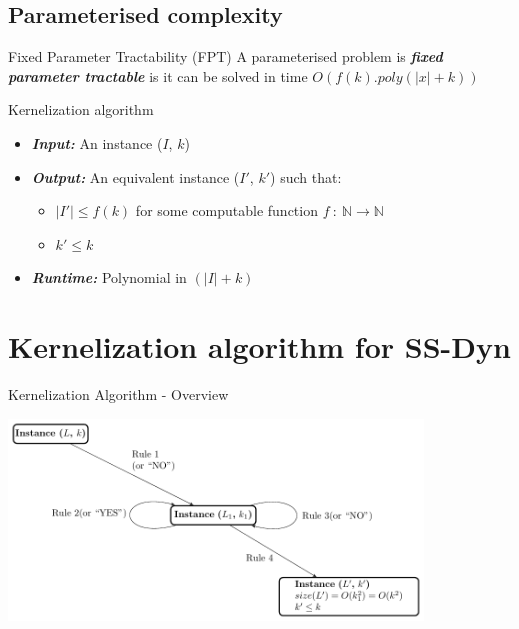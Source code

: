 \documentclass{beamer}
\newcommand{\N}{\mathbb{N}}
\begin{document}
\subsection{Parameterised complexity}
\begin{frame}
  \begin{block}{Fixed Parameter Tractability (FPT)}
    A parameterised problem is \emph{\bfseries fixed parameter tractable} is it can be solved in time $O(f(k).poly(|x|+k))$
  \end{block}
  \begin{block}{Kernelization algorithm}
    \begin{itemize}
    \item \emph{\bfseries Input:} An instance ($I$, $k$)
    \item \emph{\bfseries Output:} An equivalent instance ($I'$, $k'$) such that:
      \begin{itemize}
      \item $|I'|\leq f(k)$ for some computable function $f\ :\ \N\rightarrow \N$
      \item $k'\leq k$
      \end{itemize}
    \item \emph{\bfseries Runtime:} Polynomial in $(|I|+k)$
    \end{itemize}
  \end{block}
\end{frame}

\section{Kernelization algorithm for SS-Dyn}
\begin{frame}{Kernelization Algorithm - Overview}
  \begin{minipage}{1\linewidth}
    \centering
    \includegraphics[width=110mm]{chart.pdf}
  \end{minipage}  
\end{frame}
\end{document}
